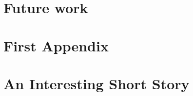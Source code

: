 \documentclass[pdftex]{pucthesis}	%
\begin{document}
\section{Future work}

%




\cleardoublepage
{} \label{references}

\renewcommand{\bibname}{REFERENCES}






\appendix %

\newpage
\section[First Appendix]{First Appendix}


\newpage
\section[An Interesting Short Story]{An Interesting Short Story}

\end{document}
